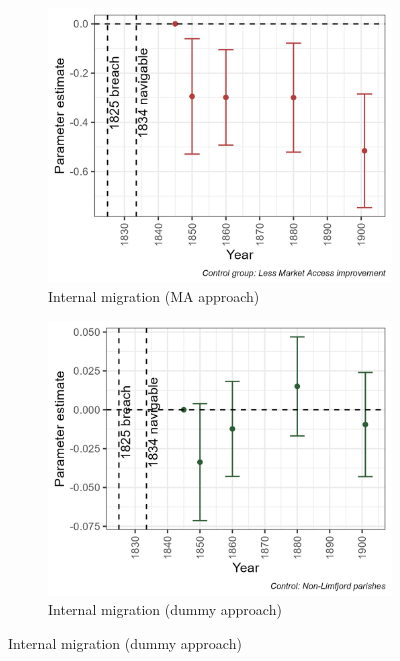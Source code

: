 \documentclass[11pt]{article}
\begin{document}
\begin{figure}[h!]
\begin{subfigure}[b]{0.45\textwidth}
    \end{subfigure}
    \vspace{0.45cm}
    \begin{subfigure}[b]{0.45\textwidth}
        \centering
        \caption{\label{fig:migr} Internal migration (MA approach)}
        \includegraphics[width=\textwidth]{Plots/Mechanism/born_different_share_MA.png}
    \end{subfigure}
    \hfill
    \begin{subfigure}[b]{0.45\textwidth}
        \centering
        \caption{\label{fig:fert} Internal migration (dummy approach)}
        \includegraphics[width=\textwidth]{Plots/Mechanism/born_different_share_Dummy.png}

\end{subfigure}
\end{figure}
\end{document}
